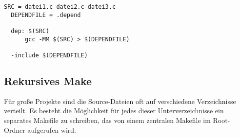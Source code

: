 \documentclass{scrartcl}
\begin{document}
\begin{lstlisting}[frame=single]
  SRC = datei1.c datei2.c datei3.c
  DEPENDFILE = .depend

  dep: $(SRC)
      gcc -MM $(SRC) > $(DEPENDFILE)

  -include $(DEPENDFILE)
\end{lstlisting}

\subsection{Rekursives Make}
\label{sec:rekursives-make}

Für große Projekte sind die Source-Dateien oft auf verschiedene
Verzeichnisse verteilt. Es besteht die Möglichkeit für jedes dieser
Unterverzeichnisse ein separates Makefile zu schreiben, das von einem
zentralen Makefile im Root-Ordner aufgerufen wird.
\end{document}
